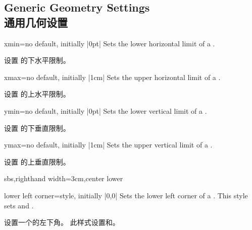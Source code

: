 \subsection{Generic Geometry Settings\\通用几何设置}\label{subsec:vignettegeometry}

\begin{vigTcbKey}[][doc new=2016-04-22]{xmin}{=}{no default, initially |0pt|}
Sets the lower horizontal limit of a .

设置  的下水平限制。
\end{vigTcbKey}

\begin{vigTcbKey}[][doc new=2016-04-22]{xmax}{=}{no default, initially |1cm|}
Sets the upper horizontal limit of a .

设置  的上水平限制。
\end{vigTcbKey}

\begin{vigTcbKey}[][doc new=2016-04-22]{ymin}{=}{no default, initially |0pt|}
Sets the lower vertical limit of a .

设置  的下垂直限制。
\end{vigTcbKey}

\begin{vigTcbKey}[][doc new=2016-04-22]{ymax}{=}{no default, initially |1cm|}
Sets the upper vertical limit of a .

设置  的上垂直限制。
\end{vigTcbKey}


\begin{dispExample*}{sbs,righthand width=3cm,center lower}
\end{dispExample*}


\begin{vigTcbKey}[][doc new=2016-04-22]{lower left corner}{=}{style, initially |0,0|}
Sets the lower left corner of a .
This style sets  and .

设置一个的左下角。 此样式设置和。
\end{vigTcbKey}

